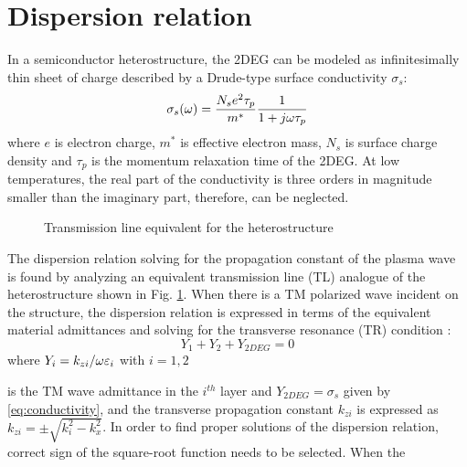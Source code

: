 \documentclass[11pt]{article}
\begin{document}
\section{Dispersion relation}

In a semiconductor heterostructure, the 2DEG can be modeled as infinitesimally thin sheet of charge described by a Drude-type surface conductivity $\sigma_s$:
%
\begin{equation}
  \sigma_s(\omega) = \frac{N_s e^2 \tau_{p}}{m^{\ast}}\frac{1}{1 + j \omega \tau_{p}}
  \label{eq:conductivity}
\end{equation}
%
where $e$ is electron charge, $m^{\ast}$ is effective electron mass, $N_s$ is surface charge density and $\tau_p$ is the momentum relaxation time of the 2DEG. At low temperatures, the real part of the conductivity is three orders in magnitude smaller than the imaginary part, therefore, can be neglected.
%
\begin{figure}
  \hspace*{-1cm}
  \def\svgwidth{1.2\linewidth}
  
  \caption{Transmission line equivalent for the heterostructure}
\end{figure}
%
The dispersion relation solving for the propagation constant of the plasma wave is found by analyzing an equivalent transmission line (TL) analogue \cite{Michalski_2005} of the heterostructure shown in Fig. \ref{}. When there is a TM polarized wave incident on the structure, the dispersion relation is expressed in terms of the equivalent material admittances and solving for the transverse resonance (TR) condition \cite{G_mez_D_az_2012}:
%
\begin{equation}
  Y_1 + Y_2 + Y_{2DEG} = 0
\end{equation}
%
where $Y_i = k_{zi}/{\omega \varepsilon_i}$ with $i = 1,2$

is the TM wave admittance in the $i^{th}$ layer and $Y_{2DEG} = \sigma_s$ given by \ref{eq:conductivity}, and the transverse propagation constant $k_{zi}$ is expressed as $k_{zi} = \pm \sqrt{k_i^2 -  k_x^2}$. In order to find proper solutions of the dispersion relation, correct sign of the square-root function needs to be selected. When the
\end{document}
